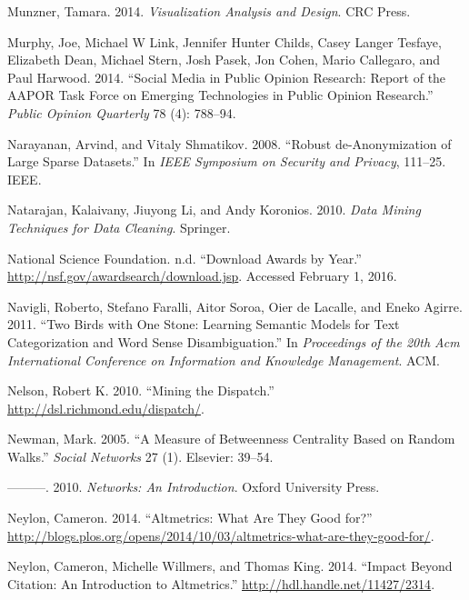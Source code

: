 \documentclass[]{krantz}
\begin{document}
\hypertarget{ref-munzner2014visualization}{}
Munzner, Tamara. 2014. \emph{Visualization Analysis and Design}. CRC
Press.

\hypertarget{ref-murphy2014social}{}
Murphy, Joe, Michael W Link, Jennifer Hunter Childs, Casey Langer
Tesfaye, Elizabeth Dean, Michael Stern, Josh Pasek, Jon Cohen, Mario
Callegaro, and Paul Harwood. 2014. ``Social Media in Public Opinion
Research: Report of the AAPOR Task Force on Emerging Technologies in
Public Opinion Research.'' \emph{Public Opinion Quarterly} 78 (4):
788--94.

\hypertarget{ref-narayanan2008robust}{}
Narayanan, Arvind, and Vitaly Shmatikov. 2008. ``Robust de-Anonymization
of Large Sparse Datasets.'' In \emph{IEEE Symposium on Security and
Privacy}, 111--25. IEEE.

\hypertarget{ref-natarajan2010data}{}
Natarajan, Kalaivany, Jiuyong Li, and Andy Koronios. 2010. \emph{Data
Mining Techniques for Data Cleaning}. Springer.

\hypertarget{ref-nsfweb}{}
National Science Foundation. n.d. ``Download Awards by Year.''
\url{http://nsf.gov/awardsearch/download.jsp}. Accessed February 1,
2016.

\hypertarget{ref-navigli-11}{}
Navigli, Roberto, Stefano Faralli, Aitor Soroa, Oier de Lacalle, and
Eneko Agirre. 2011. ``Two Birds with One Stone: Learning Semantic Models
for Text Categorization and Word Sense Disambiguation.'' In
\emph{Proceedings of the 20th Acm International Conference on
Information and Knowledge Management}. ACM.

\hypertarget{ref-nelson-10}{}
Nelson, Robert K. 2010. ``Mining the Dispatch.''
\url{http://dsl.richmond.edu/dispatch/}.

\hypertarget{ref-newman2005measure}{}
Newman, Mark. 2005. ``A Measure of Betweenness Centrality Based on
Random Walks.'' \emph{Social Networks} 27 (1). Elsevier: 39--54.

\hypertarget{ref-newman2010networks}{}
---------. 2010. \emph{Networks: An Introduction}. Oxford University
Press.

\hypertarget{ref-neylon2014plosaltmetrics}{}
Neylon, Cameron. 2014. ``Altmetrics: What Are They Good for?''
\url{http://blogs.plos.org/opens/2014/10/03/altmetrics-what-are-they-good-for/}.

\hypertarget{ref-neylon2014scap}{}
Neylon, Cameron, Michelle Willmers, and Thomas King. 2014. ``Impact
Beyond Citation: An Introduction to Altmetrics.''
\url{http://hdl.handle.net/11427/2314}.
\end{document}
